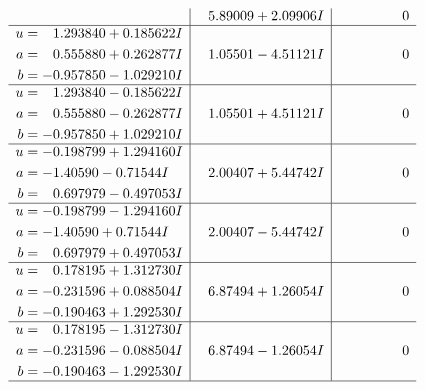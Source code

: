 \documentclass[1p]{elsarticle_modified}
\theoremstyle{definition}
\begin{document}
$$\begin{array}{c|c|c}
 & \phantom{-}5.89009 + 2.09906 I & \phantom{-0.000000 } 0 \\ \hline\begin{aligned}
u &= \phantom{-}1.293840 + 0.185622 I \\
a &= \phantom{-}0.555880 + 0.262877 I \\
b &= -0.957850 - 1.029210 I\end{aligned}
 & \phantom{-}1.05501 - 4.51121 I & \phantom{-0.000000 } 0 \\ \hline\begin{aligned}
u &= \phantom{-}1.293840 - 0.185622 I \\
a &= \phantom{-}0.555880 - 0.262877 I \\
b &= -0.957850 + 1.029210 I\end{aligned}
 & \phantom{-}1.05501 + 4.51121 I & \phantom{-0.000000 } 0 \\ \hline\begin{aligned}
u &= -0.198799 + 1.294160 I \\
a &= -1.40590 - 0.71544 I \\
b &= \phantom{-}0.697979 - 0.497053 I\end{aligned}
 & \phantom{-}2.00407 + 5.44742 I & \phantom{-0.000000 } 0 \\ \hline\begin{aligned}
u &= -0.198799 - 1.294160 I \\
a &= -1.40590 + 0.71544 I \\
b &= \phantom{-}0.697979 + 0.497053 I\end{aligned}
 & \phantom{-}2.00407 - 5.44742 I & \phantom{-0.000000 } 0 \\ \hline\begin{aligned}
u &= \phantom{-}0.178195 + 1.312730 I \\
a &= -0.231596 + 0.088504 I \\
b &= -0.190463 + 1.292530 I\end{aligned}
 & \phantom{-}6.87494 + 1.26054 I & \phantom{-0.000000 } 0 \\ \hline\begin{aligned}
u &= \phantom{-}0.178195 - 1.312730 I \\
a &= -0.231596 - 0.088504 I \\
b &= -0.190463 - 1.292530 I\end{aligned}
 & \phantom{-}6.87494 - 1.26054 I & \phantom{-0.000000 } 0\\
 \hline 
 \end{array}$$\newpage$$\begin{array}{c|c|c}  

\end{array}$$
\end{document}
